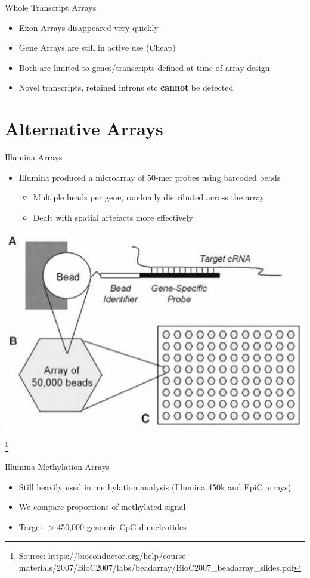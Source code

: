 \documentclass[aspectratio=169,11pt]{beamer}
\newcommand\blfootnote[1]{%
  \begingroup
  \renewcommand\thefootnote{}\footnote{#1}%
  \addtocounter{footnote}{-1}%
  \endgroup
}
\begin{document}
\begin{frame}{Whole Transcript Arrays}

	\begin{itemize}
		\item Exon Arrays disappeared very quickly
		\item Gene Arrays are still in active use (Cheap)
		\item Both are limited to genes/transcripts defined at time of array design
		\item Novel transcripts, retained introns etc \textbf{cannot} be detected 
	\end{itemize}

\end{frame}

\section{Alternative Arrays}

\begin{frame}{Illumina Arrays}

	\begin{itemize}
		\item Illumina produced a microarray of 50-mer probes using barcoded beads
		\begin{itemize}
			\item Multiple beads per gene, randomly distributed across the array
			\item Dealt with spatial artefacts more effectively
		\end{itemize}
	\end{itemize}
	
	\begin{center}
	\includegraphics[scale=0.25]{figures/Beads.png} 
	\end{center}

\blfootnote{Source: https://bioconductor.org/help/course-materials/2007/BioC2007/labs/beadarray/BioC2007\_beadarray\_slides.pdf}

\end{frame}

\begin{frame}{Illumina Methylation Arrays}

	\begin{itemize}
		\item Still heavily used in methylation analysis (Illumina 450k and EpiC arrays)
		\item We compare proportions of methylated signal
		\item Target $>$450,000 genomic CpG dinucleotides
	\end{itemize}

\end{frame}
\end{document}
